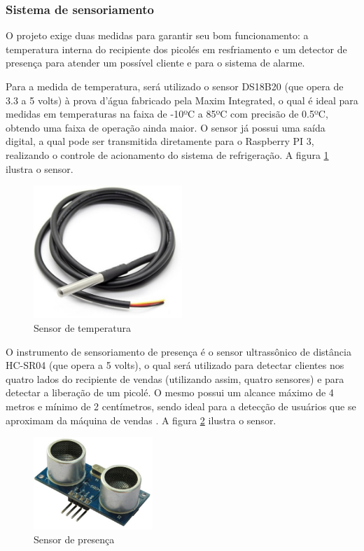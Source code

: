 \subsubsection{Sistema de sensoriamento}

O projeto exige duas medidas para garantir seu bom funcionamento: a temperatura interna do recipiente dos picolés em resfriamento e um detector de presença para atender um possível cliente e para o sistema de alarme. 

	Para a medida de temperatura, será utilizado o sensor DS18B20 (que opera de 3.3 a 5 volts) à prova d'água fabricado pela Maxim Integrated, o qual é ideal para medidas em temperaturas na faixa de -10ºC a 85ºC com precisão de 0.5ºC, obtendo uma faixa de operação ainda maior. O sensor já possui uma saída digital, a qual pode ser transmitida diretamente para o Raspberry PI 3, realizando o controle de acionamento do sistema de refrigeração. A figura \ref{fig:sensor_temperatura} ilustra o sensor.
    
\begin{figure}[H]
	\centering
    \includegraphics[width=0.5\textwidth]{figuras/sensor_temperatura}
    \caption{Sensor de temperatura}
    \label{fig:sensor_temperatura}
\end{figure}

O instrumento de sensoriamento de presença é o sensor ultrassônico de distância HC-SR04 (que opera a 5 volts), o qual será utilizado para detectar clientes nos quatro lados do recipiente de vendas (utilizando assim, quatro sensores) e para detectar a liberação de um picolé. O mesmo possui um alcance máximo de 4 metros e mínimo de 2 centímetros, sendo ideal para a detecção de usuários que se aproximam da máquina de vendas \cite{mq3}. A figura \ref{fig:sensor_presenca} ilustra o sensor.

\begin{figure}[H]
	\centering
    \includegraphics[width=0.4\textwidth]{figuras/sensor_presenca}
    \caption{Sensor de presença}
    \label{fig:sensor_presenca}
\end{figure}


